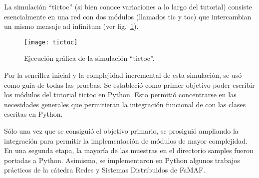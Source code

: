 La simulación ``tictoc'' (si bien conoce variaciones a lo largo del tutorial)
consiste esencialmente en una red con dos módulos (llamados tic y toc) que
intercambian un mismo mensaje ad infinitum (ver fig.~\ref{fig:tictoc}).

\begin{figure}[h]
\caption{Ejecución gráfica de la simulación ``tictoc''.}
\label{fig:tictoc}
\centering
\texttt{[image: tictoc]}
\end{figure}

Por la sencillez inicial y la complejidad incremental de esta simulación, se
usó como guía de todas las pruebas. Se estableció como primer objetivo poder
escribir los módulos del tutorial tictoc en Python. Esto permitió concentrarse
en las necesidades generales que permitieran la integración funcional de
\omnetpp{} con las clases escritas en Python.

Sólo una vez que se consiguió el objetivo primario, se prosiguió ampliando la
integración para permitir la implementación de módulos de mayor complejidad. En
una segunda etapa, la mayoría de las muestras en el directorio samples fueron
portadas a Python. Asimismo, se implementaron en Python algunos trabajos
prácticos de la cátedra Redes y Sistemas Distribuidos de FaMAF.
